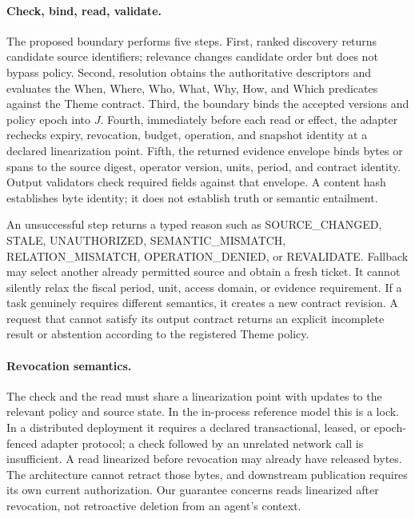 \paragraph{Check, bind, read, validate.}
The proposed boundary performs five steps. First, ranked discovery returns candidate source identifiers; relevance changes candidate order but does not bypass policy. Second, resolution obtains the authoritative descriptors and evaluates the When, Where, Who, What, Why, How, and Which predicates against the Theme contract. Third, the boundary binds the accepted versions and policy epoch into $J$. Fourth, immediately before each read or effect, the adapter rechecks expiry, revocation, budget, operation, and snapshot identity at a declared linearization point. Fifth, the returned evidence envelope binds bytes or spans to the source digest, operator version, units, period, and contract identity. Output validators check required fields against that envelope. A content hash establishes byte identity; it does not establish truth or semantic entailment.

An unsuccessful step returns a typed reason such as SOURCE\_CHANGED, STALE, UNAUTHORIZED, SEMANTIC\_MISMATCH, RELATION\_MISMATCH, OPERATION\_DENIED, or REVALIDATE. Fallback may select another already permitted source and obtain a fresh ticket. It cannot silently relax the fiscal period, unit, access domain, or evidence requirement. If a task genuinely requires different semantics, it creates a new contract revision. A request that cannot satisfy its output contract returns an explicit incomplete result or abstention according to the registered Theme policy.

\paragraph{Revocation semantics.}
The check and the read must share a linearization point with updates to the relevant policy and source state. In the in-process reference model this is a lock. In a distributed deployment it requires a declared transactional, leased, or epoch-fenced adapter protocol; a check followed by an unrelated network call is insufficient. A read linearized before revocation may already have released bytes. The architecture cannot retract those bytes, and downstream publication requires its own current authorization. Our guarantee concerns reads linearized after revocation, not retroactive deletion from an agent's context.

